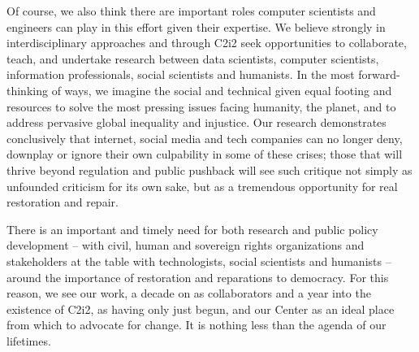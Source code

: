 \documentclass[11pt]{article}
\begin{document}
Of course, we also think there are important roles computer scientists and engineers can play in this effort given their expertise. We believe strongly in interdisciplinary approaches and through C2i2  seek opportunities to collaborate, teach, and undertake  research between data scientists, computer scientists, information professionals, social scientists and humanists. In the most forward-thinking of ways, we imagine the social and technical given equal footing and resources to solve the most pressing issues facing humanity, the planet, and to address pervasive global inequality and injustice. Our research demonstrates conclusively that internet, social media and tech companies can no longer deny, downplay or ignore their own culpability in some of these crises; those that will thrive beyond regulation and public pushback will see such critique not simply as unfounded criticism for its own sake, but as a tremendous opportunity for real restoration and repair.


There is an important and timely need for both research and public policy development -- with civil, human and sovereign rights organizations and stakeholders at the table with technologists, social scientists and humanists -- around the importance of restoration and reparations to democracy. For this reason, we see our work, a decade on as collaborators and a year into the existence of C2i2, as having only just begun, and our Center as an ideal place from which to advocate for change. It is nothing less than the agenda of our lifetimes.


\vspace{-.1cm}
%
%
%
\end{document}
